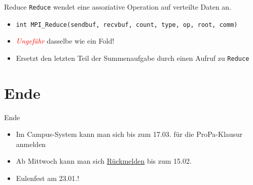 \documentclass{beamer}
\begin{document}
\begin{frame}{Reduce}
	\texttt{Reduce} wendet eine assoziative Operation auf verteilte Daten an.

	\begin{figure}
	\end{figure}

	\begin{itemize}
		\item {\footnotesize \texttt{int MPI_Reduce(sendbuf, recvbuf, count, type, op, root, comm)}}
		\item \textcolor{red}{\emph{Ungefähr}} dasselbe wie ein Fold!
		\pause
		\item Ersetzt den letzten Teil der Summenaufgabe durch einen Aufruf zu \texttt{Reduce}
	\end{itemize}
\end{frame}

\section{Ende}

\begin{frame}{Ende}
	\begin{itemize}
		\item Im Campus-System kann man sich bis zum 17.03. für die ProPa-Klausur anmelden
		\item Ab Mittwoch kann man sich \href{https://campus.studium.kit.edu/renewal/payment.php}{Rückmelden} bis zum 15.02.
		\item Eulenfest am 23.01.!
	\end{itemize}
\end{frame}
\end{document}
